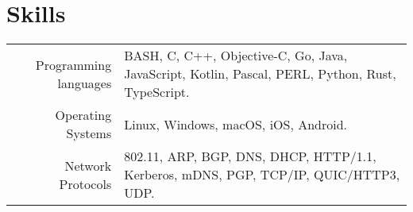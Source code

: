 \documentclass[a4paper,10pt]{article} %
\begin{document}
\section{Skills}

\begin{tabular}{r|p{10cm}}

Programming languages & BASH, C, C++, Objective-C, Go, Java, JavaScript, Kotlin, Pascal, PERL, Python, Rust, TypeScript.\\
Operating Systems & Linux, Windows, macOS, iOS, Android.\\
Network Protocols & 802.11, ARP, BGP, DNS, DHCP, HTTP/1.1, Kerberos, mDNS, PGP, TCP/IP, QUIC/HTTP3, UDP.

\end{tabular}

\end{document}
